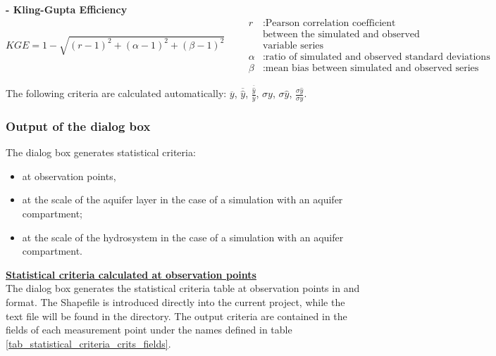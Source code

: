 \textbf{ - Kling-Gupta Efficiency} \citep{gupta2012}
\begin{equation}
    KGE = 1 - \sqrt{(r - 1)^2 + (\alpha - 1)^2 + (\beta - 1)^2} 
    \quad \quad
    \begin{array}{ll}
         r & : \text{Pearson correlation coefficient} \\ 
         & \text{between the simulated and observed} \\ 
         & \text{variable series} \\
        \alpha & : \text{ratio of simulated and observed standard deviations} \\
        \beta  & : \text{mean bias between simulated and observed series}
    \end{array}
\end{equation}




The following criteria are calculated automatically: $\overline{y}$, $\overline{\hat{y}}$, $\frac{\overline{\hat{y}}}{\overline{y}}$, $\sigma y$,  $\sigma \hat{y}$, $\frac{\sigma \hat{y}}{\sigma y}$.

\subsubsection*{Output of the  dialog box}
\label{sec_stats_crits}

The dialog box generates statistical criteria: 
\begin{itemize}
    \item at observation points,  
    \item at the scale of the aquifer layer in the case of a simulation with an aquifer compartment;
    \item at the scale of the hydrosystem in the case of a simulation with an aquifer compartment.
\end{itemize}
\vspace{0.3cm}

\underline{\textbf{Statistical criteria calculated at observation points}}\\
The dialog box generates the statistical criteria table at observation points in  and  format. The Shapefile is introduced directly into the current  project, while the text file will be found in the  directory. 
The output criteria are contained in the fields of each measurement point under the names defined in table \ref{tab_statistical_criteria_crits_fields}.

